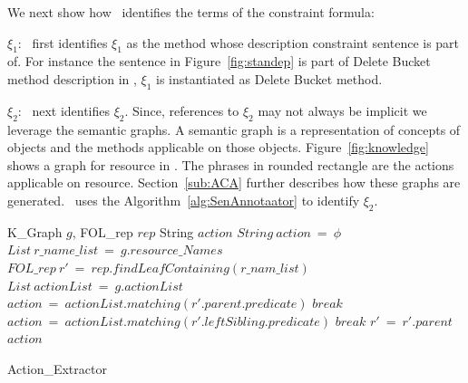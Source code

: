 
We next show how \tool\ identifies the terms of the constraint formula:


\textbf{$\xi_1$}:
\tool\ first identifies $\xi_1$ as the method whose description constraint sentence is part of.
For instance the sentence in Figure~\ref{fig:standep} is part of Delete Bucket method description in \amazonAPI,
$\xi_1$ is instantiated as Delete Bucket method.


\textbf{$\xi_2$}:
\tool\ next identifies $\xi_2$. Since, references to $\xi_2$ may not always be implicit we leverage the semantic graphs. A semantic graph is a representation of concepts of objects and the methods applicable on those objects. Figure~\ref{fig:knowledge} shows a graph for  resource in \amazonAPI.
The phrases in rounded rectangle are the actions applicable on  resource.
Section~\ref{sub:ACA} further describes how these graphs are generated.
\tool\ uses the Algorithm~\ref{alg:SenAnnotaator} to identify $\xi_2$.
  

\begin{algorithm}[t!]
\begin{algorithmic}[1]
\begin{scriptsize}
\REQUIRE K\_Graph $g$, FOL\_rep $rep$ 
\ENSURE String $action$
\STATE $String\ action\ =\ \phi$
\STATE $List\ r\_name\_list\ =\ g.resource\_Names$
\STATE $FOL\_rep\ r'\ =\ rep.findLeafContaining(r\_nam\_list)$
\STATE $List\ actionList\ =\ g.actionList$
		\STATE $action\ =\ actionList.matching(r'.parent.predicate)$
		\STATE $break$
	\ELSE
			\STATE $action\ =\ actionList.matching(r'.leftSibling.predicate)$
			\STATE $break$
		\ENDIF
	\ENDIF
	\STATE $r'\ =\ r'.parent$
\ENDWHILE
\RETURN $action$
\end{scriptsize}
\end{algorithmic}
\caption{Action\_Extractor}
\label{alg:SenAnnotaator}
\end{algorithm} 


